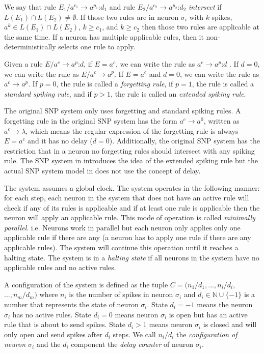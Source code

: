 \documentclass[]{elsarticle}
\theoremstyle{definition}
\theoremstyle{definition}
\newcommand{\ra}{\rightarrow}
\newcommand{\sm}{\text{:}}
\begin{document}
We say that rule $E_1/a^{c_1}\ra a^{p_1}\sm d_1$ and rule $E_2/a^{c_2}\ra a^{p_2}\sm d_2$ \emph{intersect}
if $L(E_1) \cap L(E_2) \neq \emptyset$. If those two rules are in neuron $\sigma_i$ with $k$ spikes,
$a^k \in L(E_1) \cap L(E_2)$, $k\geq c_1$, and $k\geq c_2$ then those two rules are applicable at
the same time. If a neuron has multiple applicable rules, then it non-deterministically selects one
rule to apply.

Given a rule $E/a^c \ra a^p\sm d$, if $E = a^c$, we can write the rule as $a^c \ra a^p\sm d$ . If $d=0$, 
we can write the rule as $E/a^c \ra a^p$. If $E=a^c$ and $d=0$, we can write the rule as $a^c \ra 
a^p$. If $p=0$, the rule is called a \emph{forgetting rule}, if $p=1$, the rule is called a 
\emph{standard spiking rule}, and if $p>1$, the rule is called an \emph{extended spiking rule}.

The original SNP system \cite{ionescu-2006-snp} only uses forgetting and standard spiking rules.
A forgetting rule in the original SNP system has the form $a^c \ra a^0$, written as $a^c\ra\lambda$,
which means the regular expression of the forgetting rule is always $E=a^c$ and it has no delay
($d=0$). Additionally, the original SNP system has the restriction that in a neuron no forgetting 
rules should intersect with any spiking rule. The SNP system in \cite{chen-2008-snp-e} introduces
the idea of the extended spiking rule but the actual SNP system model in \cite{chen-2008-snp-e} does
not use the concept of delay. 

The system assumes a global clock. The system operates in the following manner: for each step, each 
neuron in the system that does not have an active rule will check if any of its rules is applicable 
and if at least one rule is applicable then the neuron will apply an applicable rule. This mode of
operation is called \emph{minimally parallel}. i.e. Neurons work in parallel but each neuron only
applies only one applicable rule if there are any (a neuron has to apply one rule if there are any
applicable rules). The system will continue this operation until it reaches a halting state. The 
system is in a \emph{halting state} if all neurons in the system have no applicable rules and no
active rules. 

A configuration of the system is defined as the tuple $ C = (n_1/d_1,...,n_i/d_i,$ $...,n_m/d_m)$ 
where $n_i$ is the number of spikes in neuron $\sigma_i$ and $d_i \in \mathbb{N} \cup \{-1\}$ is a
number that represents the state of neuron $\sigma_i$. State $d_i=-1$ means the neuron $\sigma_i$ 
has no active rules. State $d_i=0$ means neuron $\sigma_i$ is open but has an active rule that is 
about to send spikes. State $d_i > 1$ means neuron $\sigma_i$ is closed and will only open and send 
spikes after $d_i$ steps. We call $n_i/d_i$ the \emph{configuration of neuron $\sigma_i$} and the
$d_i$ component the \emph{delay counter} of neuron $\sigma_i$.
\end{document}
